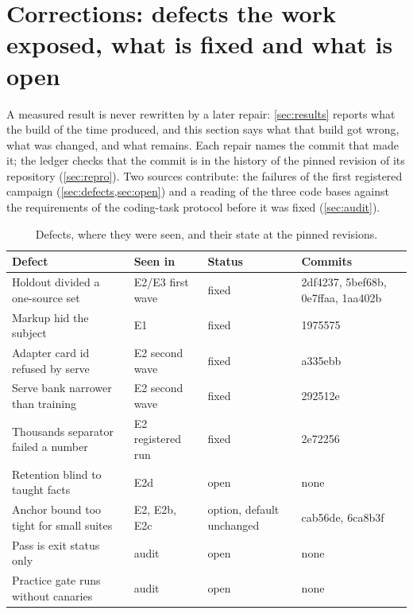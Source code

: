 
\section{Corrections: defects the work exposed, what is fixed and what is open}\label{sec:corrections}

A measured result is never rewritten by a later repair: \cref{sec:results} reports what
the build of the time produced, and this section says what that build got wrong, what was
changed, and what remains. Each repair names the commit that made it; the ledger checks
that the commit is in the history of the pinned revision of its repository (\cref{sec:repro}).
Two sources contribute: the failures of the first registered campaign
(\cref{sec:defects,sec:open}) and a reading of the three code bases against the
requirements of the coding-task protocol before it was fixed (\cref{sec:audit}).

\begin{table}[t]
\centering\small
\begin{tabular}{p{4.7cm}p{3.4cm}p{1.6cm}p{4.2cm}}
\toprule
Defect & Seen in & Status & Commits \\
\midrule
Holdout divided a one-source set & E2/E3 first wave & fixed & 2df4237, 5bef68b, 0e7ffaa, 1aa402b \\
Markup hid the subject & E1 & fixed & 1975575 \\
Adapter card id refused by serve & E2 second wave & fixed & a335ebb \\
Serve bank narrower than training & E2 second wave & fixed & 292512e \\
Thousands separator failed a number & E2 registered run & fixed & 2e72256 \\
Retention blind to taught facts & E2d & open & none \\
Anchor bound too tight for small suites & E2, E2b, E2c & option, default unchanged & cab56de, 6ca8b3f \\
Pass is exit status only & audit & open & none \\
Practice gate runs without canaries & audit & open & none \\
\bottomrule
\end{tabular}
\caption{Defects, where they were seen, and their state at the pinned revisions.}\label{tab:corrections}
\end{table}

